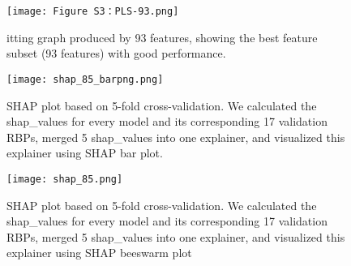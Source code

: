 \documentclass[a4paper,12pt]{article}
\begin{document}
\begin{figure}
\centering
\texttt{[image: Figure S3：PLS-93.png]}
\caption{\label{pic3} itting graph produced by 93 features, showing the best feature subset (93 features) with good performance. }
\end{figure}

\begin{figure}
\centering
\texttt{[image: shap\_85\_barpng.png]}
\caption{\label{pic4} SHAP plot based on 5-fold cross-validation. We calculated the shap\_values for every model and its corresponding 17 validation RBPs, merged 5 shap\_values into one explainer, and visualized this explainer using SHAP bar plot.}
\end{figure}

\begin{figure}
\centering
\texttt{[image: shap\_85.png]}
\caption{\label{pic5} SHAP plot based on 5-fold cross-validation. We calculated the shap\_values for every model and its corresponding 17 validation RBPs, merged 5 shap\_values into one explainer, and visualized this explainer using SHAP beeswarm plot}
\end{figure}
\end{document}
